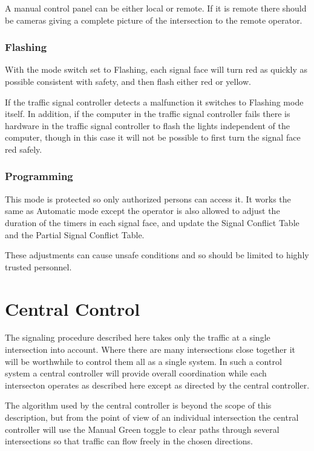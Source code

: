 \documentclass[letterpaper,twoside]{article}
\begin{document}
A manual control panel can be either local or remote.  If it is remote
there should be cameras giving a complete picture of the intersection
to the remote operator.

\subsubsection{Flashing}

With the mode switch set to Flashing, each signal face will
turn red as quickly as possible consistent with safety, and then
flash either red or yellow.

If the traffic signal controller detects a malfunction it switches
to Flashing mode itself.  In addition, if the computer in the traffic
signal controller fails there is hardware in the traffic signal
controller to flash the lights independent of the computer,
though in this case it will not be possible to first turn the
signal face red safely.

\subsubsection{Programming}

This mode is protected so only authorized persons can access it.
It works the same as Automatic mode except the operator is also allowed to
adjust the duration of the timers in each signal face, and update the
Signal Conflict Table and the Partial Signal Conflict Table.

These adjustments can cause unsafe conditions and so should be limited
to highly trusted personnel.

\section{Central Control}

The signaling procedure described here takes only the traffic at a single
intersection into account.  Where there are many intersections close
together it will be worthwhile to control them all as a single system.
In such a control system a central controller will provide overall
coordination while each intersecton operates as described here except as
directed by the central controller.

The algorithm used by the central controller is beyond the scope of this
description, but from the point of view of an individual intersection
the central controller will use the Manual Green toggle to clear paths
through several intersections so that traffic can flow freely in the
chosen directions.
\end{document}
